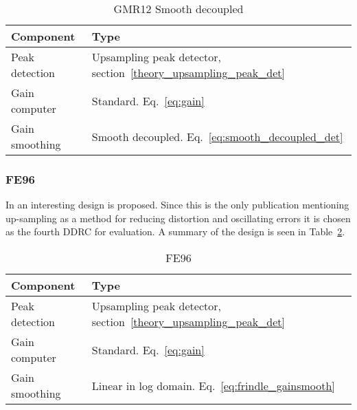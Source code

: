 \documentclass[../main2.tex]{subfiles}
\begin{document}
\begin{table}[h]
\begin{center}
\caption{GMR12 Smooth decoupled}
\label{tab:gmr12_decoupled}
\begin{tabular}{| l | l |}
	\hline
	Component & Type \\ \hline
	Peak detection & Upsampling peak detector, section~\ref{theory_upsampling_peak_det} \\
	Gain computer & Standard. Eq.~\eqref{eq:gain} \\
	Gain smoothing & Smooth decoupled. Eq.~\eqref{eq:smooth_decoupled_det} \\
	\hline
\end{tabular}
\end{center}
\end{table}
\subsubsection{FE96}
In \cite{frindle1996implementation} an interesting design is proposed. Since this is the only publication mentioning up-sampling as a method for reducing distortion and oscillating errors it is chosen as the fourth DDRC for evaluation. A summary of the design is seen in Table~\ref{tab:fe96}.
\begin{table}[h]
\begin{center}
\caption{FE96}
\label{tab:fe96}
\begin{tabular}{| l | l |}
	\hline
	Component & Type \\ \hline
	Peak detection & Upsampling peak detector, section~\ref{theory_upsampling_peak_det} \\
	Gain computer & Standard. Eq.~\eqref{eq:gain} \\
	Gain smoothing & Linear in log domain. Eq.~\eqref{eq:frindle_gainsmooth} \\
	\hline
\end{tabular}
\end{center}
\end{table}
\end{document}
